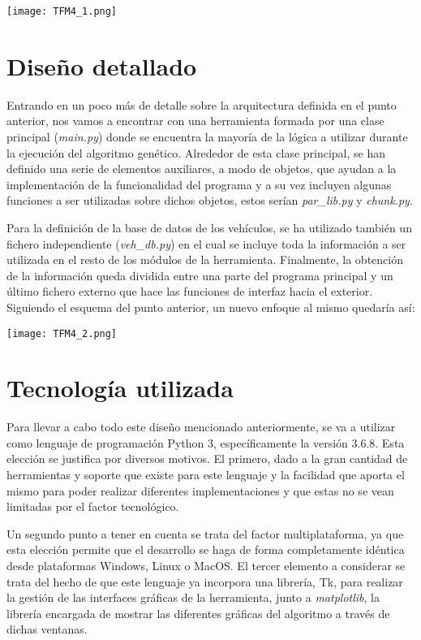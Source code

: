 \documentclass[11pt,spanish,listoffigures,listoftables]{tfgetsinf}
\begin{document}
\begin{center}
\texttt{[image: TFM4\_1.png]}    
\end{center}

\section{Diseño detallado}
Entrando en un poco más de detalle sobre la arquitectura definida en el punto anterior, nos vamos a encontrar con una herramienta formada por una clase principal (\textit{main.py}) donde se encuentra la mayoría de la lógica a utilizar durante la ejecución del algoritmo genético. Alrededor de esta clase principal, se han definido una serie de elementos auxiliares, a modo de objetos, que ayudan a la implementación de la funcionalidad del programa y a su vez incluyen algunas funciones a ser utilizadas sobre dichos objetos, estos serían \textit{par\_lib.py} y \textit{chunk.py}.

Para la definición de la base de datos de los vehículos, se ha utilizado también un fichero independiente (\textit{veh\_db.py}) en el cual se incluye toda la información a ser utilizada en el resto de los módulos de la herramienta. Finalmente, la obtención de la información queda dividida entre una parte del programa principal y un último fichero externo que hace las funciones de interfaz hacia el exterior. Siguiendo el esquema del punto anterior, un nuevo enfoque al mismo quedaría así:

\begin{center}
\texttt{[image: TFM4\_2.png]}    
\end{center}

\section{Tecnología utilizada}
Para llevar a cabo todo este diseño mencionado anteriormente, se va a utilizar como lenguaje de programación Python 3, específicamente la versión 3.6.8. Esta elección se justifica por diversos motivos. El primero, dado a la gran cantidad de herramientas y soporte que existe para este lenguaje y la facilidad que aporta el mismo para poder realizar diferentes implementaciones y que estas no se vean limitadas por el factor tecnológico.

Un segundo punto a tener en cuenta se trata del factor multiplataforma, ya que esta elección permite que el desarrollo se haga de forma completamente idéntica desde plataformas Windows, Linux o MacOS. El tercer elemento a considerar se trata del hecho de que este lenguaje ya incorpora una librería, Tk, para realizar la gestión de las interfaces gráficas de la herramienta, junto a \textit{matplotlib}, la librería encargada de mostrar las diferentes gráficas del algoritmo a través de dichas ventanas.
\end{document}
